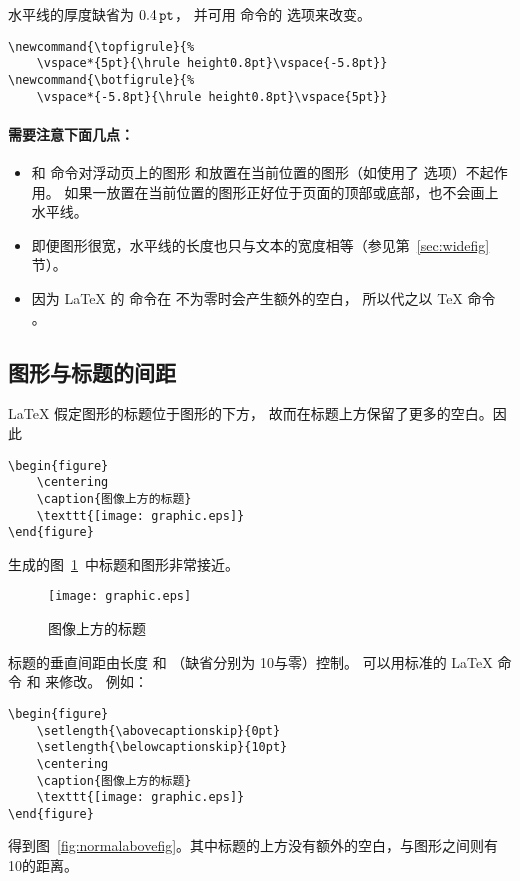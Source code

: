 水平线的厚度缺省为 $0.4\,\mathtt{pt}$，
并可用  命令的  选项来改变。
\begin{lstlisting}
\newcommand{\topfigrule}{% 
	\vspace*{5pt}{\hrule height0.8pt}\vspace{-5.8pt}} 
\newcommand{\botfigrule}{% 
	\vspace*{-5.8pt}{\hrule height0.8pt}\vspace{5pt}}
\end{lstlisting}

\paragraph{需要注意下面几点：}
\begin{itemize}
	\item {} 和  命令对浮动页上的图形
	和放置在当前位置的图形（如使用了 选项）不起作用。
	如果一放置在当前位置的图形正好位于页面的顶部或底部，也不会画上水平线。
	\item 即便图形很宽，水平线的长度也只与文本的宽度相等（参见第~\ref{sec:widefig} 节）。
	\item 因为 \LaTeX{} 的 命令在  不为零时会产生额外的空白，
	所以代之以 \TeX{} 命令 。
\end{itemize}


\subsection{图形与标题的间距}\label{ssec:capspace}

\LaTeX{} 假定图形的标题位于图形的下方，
故而在标题上方保留了更多的空白。因此
\begin{lstlisting}
\begin{figure} 
	\centering 
	\caption{图像上方的标题} 
	\texttt{[image: graphic.eps]} 
\end{figure}
\end{lstlisting}
生成的图~\ref{fig:verynearcap}~中标题和图形非常接近。

\begin{figure} 
	\centering 
	\caption{图像上方的标题} \label{fig:verynearcap}
	\texttt{[image: graphic.eps]} 
\end{figure}

标题的垂直间距由长度  和 
（缺省分别为 10\pt 与零）控制。
可以用标准的 \LaTeX{} 命令  和  来修改。
例如：
\begin{lstlisting}
\begin{figure} 
	\setlength{\abovecaptionskip}{0pt} 
	\setlength{\belowcaptionskip}{10pt} 
	\centering 
	\caption{图像上方的标题} 
	\texttt{[image: graphic.eps]} 
\end{figure}
\end{lstlisting}
得到图~\ref{fig:normalabovefig}。其中标题的上方没有额外的空白，与图形之间则有 10\pt 的距离。

